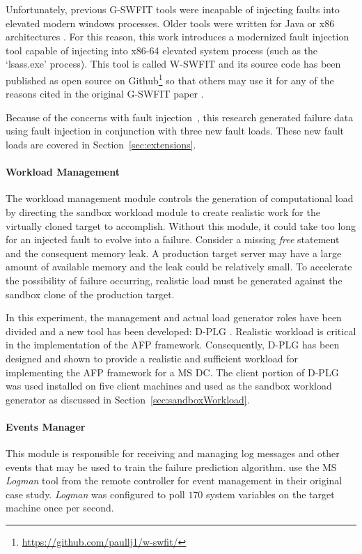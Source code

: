 Unfortunately, previous \ac{G-SWFIT} tools were incapable of injecting faults
into elevated modern windows processes.  Older tools were written for Java or
x86 architectures \citep{gswfit,martins2002jaca,natella2010,sanches2011jswfit}.
For this reason, this work introduces a modernized fault injection tool capable
of injecting into x86-64 elevated system process (such as the `lsass.exe'
process).  This tool is called \ac{W-SWFIT} and its source code has been
published as open source on
Github\footnote{\url{https://github.com/paullj1/w-swfit/}} so that others may
use it for any of the reasons cited in the original \ac{G-SWFIT} paper
\citep{gswfit}.

Because of the concerns with fault
injection~\citep{cotroneo2012,kikuchi2014,natella2010}, this research generated
failure data using fault injection in conjunction with three new fault loads.
These new fault loads are covered in Section~\ref{sec:extensions}.

\paragraph{Workload Management} \label{sec:workloadMgr} 
The workload management module controls the generation of computational load by
directing the sandbox workload module to create realistic work for the
virtually cloned target to accomplish.  Without this module, it could take too
long for an injected fault to evolve into a failure.  Consider a missing
\emph{free} statement and the consequent memory leak.  A production target
server may have a large amount of available memory and the leak could be
relatively small.  To accelerate the possibility of failure occurring,
realistic load must be generated against the sandbox clone of the production
target.

In this experiment, the management and actual load generator roles have been
divided and a new tool has been developed: \ac{D-PLG} \citep{jordan2016}.
Realistic workload is critical in the implementation of the \ac{AFP} framework.
Consequently, \ac{D-PLG} has been designed and shown to provide a realistic and
sufficient workload for implementing the \ac{AFP} framework for a \ac{MS}
\ac{DC}.  The client portion of \ac{D-PLG} was used installed on five client
machines and used as the sandbox workload generator as discussed in
Section~\ref{sec:sandboxWorkload}.

\paragraph{Events Manager} \label{sec:eventsManagerMgr}
This module is responsible for receiving and managing log messages and other
events that may be used to train the failure prediction algorithm.
\citet{irrera2015} use the \ac{MS} \emph{Logman} tool from the remote
controller for event management in their original case study.  \emph{Logman}
was configured to poll $170$ system variables on the target machine once per
second.  

